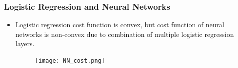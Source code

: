 \begin{frame}
\frametitle{Logistic Regression and Neural Networks}
\begin{itemize}
\item Logistic regression cost function is convex, but cost function of neural networks is non-convex due to combination of multiple logistic regression layers.
\begin{figure}
\texttt{[image: NN\_cost.png]}
\end{figure}
\end{itemize}
\end{frame}
